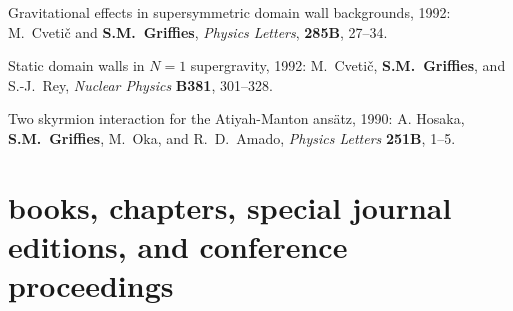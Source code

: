 \begin{etaremune}
\item Gravitational effects in supersymmetric domain wall
backgrounds, 1992: M.\ Cveti\v c and {\bf S.M.\ Grif\/f\/ies}, {\em
Physics Letters}, {\bf 285B}, 27--34.

\item Static domain walls in $N=1$ supergravity, 1992: M.\ Cveti\v
c, {\bf S.M.\ Grif\/f\/ies}, and S.-J.\ Rey, {\em Nuclear Physics}
{\bf B381}, 301--328.

\item Two skyrmion interaction for the Atiyah-Manton ans\"atz, 1990: 
A. Hosaka, {\bf S.M.\ Grif\/f\/ies}, M.\ Oka, and R.\ D.\ Amado, {\em
Physics Letters} {\bf 251B}, 1--5.


\end{etaremune}

\section*{\sc \color{Maroon} books, chapters, special journal editions, and
  conference proceedings}


